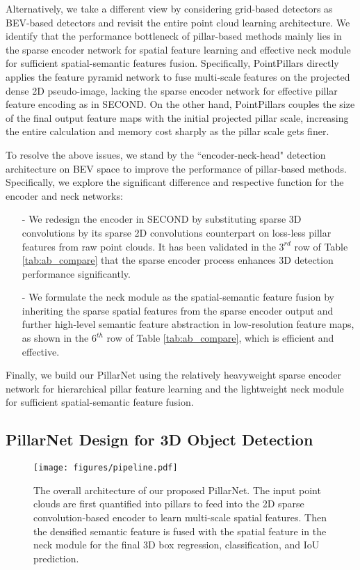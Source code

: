 \documentclass[runningheads]{llncs}
\begin{document}
Alternatively, we take a different view by considering grid-based detectors as BEV-based detectors and revisit the entire point cloud learning architecture.  
We identify that the performance bottleneck of pillar-based methods mainly lies in the sparse encoder network for spatial feature learning and effective neck module for sufficient spatial-semantic features fusion.
Specifically, PointPillars directly applies the feature pyramid network to fuse multi-scale features on the projected dense 2D pseudo-image, lacking the sparse encoder network for effective pillar feature encoding as in SECOND.
On the other hand, PointPillars couples the size of the final output feature maps with the initial projected pillar scale, increasing the entire calculation and memory cost sharply as the pillar scale gets finer.

To resolve the above issues, we stand by the ``encoder-neck-head" detection architecture on BEV space to improve the performance of pillar-based methods.
Specifically, we explore the significant difference and respective function for the encoder and neck networks:
\begin{enumerate}
\item[-] We redesign the encoder in SECOND by substituting sparse 3D convolutions by its sparse 2D convolutions counterpart on loss-less pillar features from raw point clouds. It has been validated in the $3^{rd}$ row of Table \ref{tab:ab_compare} that the sparse encoder process enhances 3D detection performance significantly.
\item[-] We formulate the neck module as the spatial-semantic feature fusion by inheriting the sparse spatial features from the sparse encoder output and further high-level semantic feature abstraction in low-resolution feature maps, as shown in the $6^{th}$ row of Table \ref{tab:ab_compare}, which is efficient and effective.
\end{enumerate}
Finally, we build our PillarNet using the relatively heavyweight sparse encoder network for hierarchical pillar feature learning and the lightweight neck module for sufficient spatial-semantic feature fusion.


\subsection{PillarNet Design for 3D Object Detection}

\begin{figure}
\centering
\texttt{[image: figures/pipeline.pdf]}
\caption{The overall architecture of our proposed PillarNet. The input point clouds are first quantified into pillars to feed into the 2D sparse convolution-based encoder to learn multi-scale spatial features. Then the densified semantic feature is fused with the spatial feature in the neck module for the final 3D box regression, classification, and IoU prediction.}
\label{fig:pipeline}
\end{figure}
\end{document}
